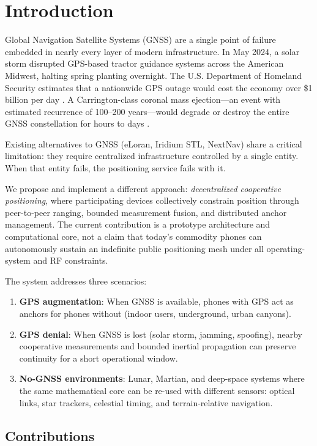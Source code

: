 \documentclass[12pt,a4paper]{article}
\begin{document}
\section{Introduction}

Global Navigation Satellite Systems (GNSS) are a single point of failure embedded in nearly every layer of modern infrastructure. In May 2024, a solar storm disrupted GPS-based tractor guidance systems across the American Midwest, halting spring planting overnight. The U.S. Department of Homeland Security estimates that a nationwide GPS outage would cost the economy over \$1 billion per day \citep{dhs2021pnt}. A Carrington-class coronal mass ejection---an event with estimated recurrence of 100--200 years---would degrade or destroy the entire GNSS constellation for hours to days \citep{cannon2013extreme}.

Existing alternatives to GNSS (eLoran, Iridium STL, NextNav) share a critical limitation: they require centralized infrastructure controlled by a single entity. When that entity fails, the positioning service fails with it.

We propose and implement a different approach: \emph{decentralized cooperative positioning}, where participating devices collectively constrain position through peer-to-peer ranging, bounded measurement fusion, and distributed anchor management. The current contribution is a prototype architecture and computational core, not a claim that today's commodity phones can autonomously sustain an indefinite public positioning mesh under all operating-system and RF constraints.

The system addresses three scenarios:
\begin{enumerate}
    \item \textbf{GPS augmentation}: When GNSS is available, phones with GPS act as anchors for phones without (indoor users, underground, urban canyons).
    \item \textbf{GPS denial}: When GNSS is lost (solar storm, jamming, spoofing), nearby cooperative measurements and bounded inertial propagation can preserve continuity for a short operational window.
    \item \textbf{No-GNSS environments}: Lunar, Martian, and deep-space systems where the same mathematical core can be re-used with different sensors: optical links, star trackers, celestial timing, and terrain-relative navigation.
\end{enumerate}

\subsection{Contributions}
\end{document}
